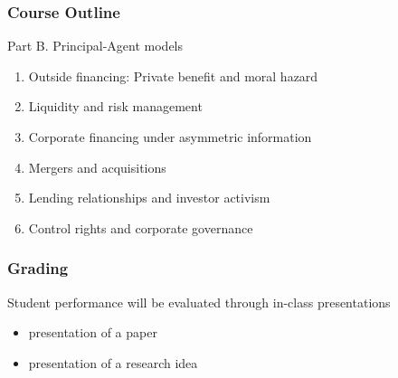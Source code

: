 \documentclass[blue]{beamer}
\theoremstyle{definition}
\theoremstyle{example}
\begin{document}

\begin{frame}\frametitle{Course Outline}

\begin{center}
Part B. Principal-Agent models
\end{center}


    \begin{enumerate}[1.]
    \item Outside financing: Private benefit and moral hazard
    \item Liquidity and risk management
    \item Corporate financing under asymmetric information
    \item Mergers and acquisitions
    \item Lending relationships and investor activism
    \item Control rights and corporate governance
    \end{enumerate}

\end{frame}

\begin{frame}\frametitle{Grading}

Student performance will be evaluated through in-class presentations
\begin{itemize}
  \item presentation of a paper
  \item presentation of a research idea
\end{itemize}

\end{frame}
\end{document}
